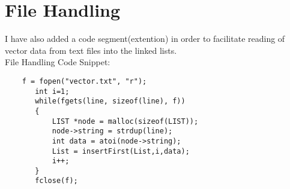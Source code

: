 \documentclass[journal,12pt,twocolumn]{IEEEtran}
\begin{document}
\section{File Handling}

I have also added a code segment(extention) in order to facilitate reading of vector data from text files into the linked lists.\\
File Handling Code Snippet:
\begin{lstlisting}
    f = fopen("vector.txt", "r");
       int i=1;
       while(fgets(line, sizeof(line), f))
       {
           LIST *node = malloc(sizeof(LIST));
           node->string = strdup(line);
           int data = atoi(node->string);
           List = insertFirst(List,i,data);
           i++;
       }
       fclose(f);

\end{lstlisting}
\end{document}
